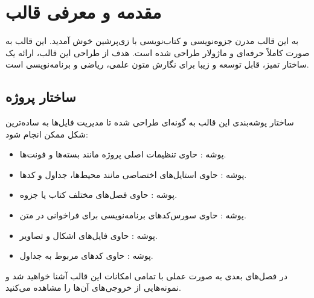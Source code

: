 \chapter{مقدمه و معرفی قالب}
\label{chap:intro}

به این قالب مدرن جزوه‌نویسی و کتاب‌نویسی با زی‌پرشین خوش آمدید. این قالب به صورت کاملاً حرفه‌ای و ماژولار طراحی شده است. هدف از طراحی این قالب، ارائه یک ساختار تمیز، قابل توسعه و زیبا برای نگارش متون علمی، ریاضی و برنامه‌نویسی است. 

\section{ساختار پروژه‌}
ساختار پوشه‌بندی این قالب به گونه‌ای طراحی شده تا مدیریت فایل‌ها به ساده‌ترین شکل ممکن انجام شود:
\begin{itemize}
    \item پوشه : حاوی تنظیمات اصلی پروژه مانند بسته‌ها و فونت‌ها.
    \item پوشه : حاوی استایل‌های اختصاصی مانند محیط‌ها، جداول و کدها.
    \item پوشه : حاوی فصل‌های مختلف کتاب یا جزوه.
    \item پوشه : حاوی سورس‌کدهای برنامه‌نویسی برای فراخوانی در متن.
    \item پوشه : حاوی فایل‌های اشکال و تصاویر.
    \item پوشه : حاوی کدهای مربوط به جداول.
\end{itemize}

در فصل‌های بعدی به صورت عملی با تمامی امکانات این قالب آشنا خواهید شد و نمونه‌هایی از خروجی‌های آن‌ها را مشاهده می‌کنید.
